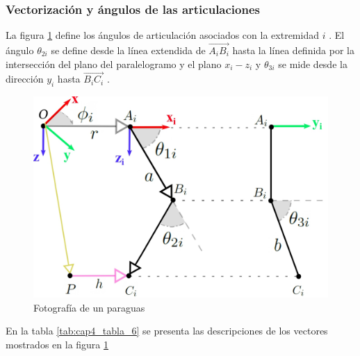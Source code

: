     \newpage

        \subsubsection{Vectorización y ángulos de las articulaciones} \label{cap4_angulosinteriores}
        
        La figura \ref{f:Cap4_Metodo_A_Modelacion_Cinematica_Posicion_8} define los ángulos de articulación asociados con la extremidad  \( i \) . El ángulo \(  \theta _{2i} \)  se define desde la línea extendida de  \( \overrightarrow{A_{i}B_{i}} \)  hasta la línea definida por la intersección del plano del paralelogramo y el plano  \( x_{i}-z_{i} \)  y  \(  \theta _{3i} \)  se mide desde la dirección  \( y_{i} \)  hasta  \( \overrightarrow{B_{i}C_{i}} \) .
        
        \begin{figure}[htb]
             \centering
             \includegraphics[width=1.0\linewidth]{Main/Chapter4/Images4/DIBUJO21.jpg}
              \caption{Fotografía de un paraguas}
              \label{f:Cap4_Metodo_A_Modelacion_Cinematica_Posicion_8}
        \end{figure}
        
        
        En la tabla \ref{tab:cap4_tabla_6} se presenta las descripciones de los vectores mostrados en la figura  \ref{f:Cap4_Metodo_A_Modelacion_Cinematica_Posicion_8}
        
